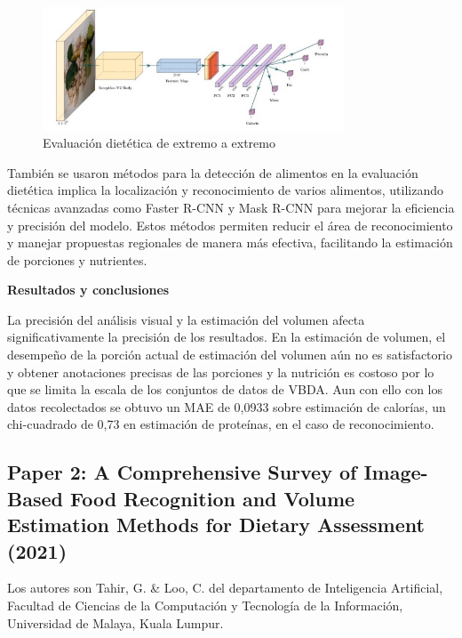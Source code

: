 \begin{figure}[h]
		\begin{center}
			\includegraphics[width=0.8\textwidth]{2/imagen2/7FIGURA7PAPER2.JPG}
			\caption{Evaluación dietética de extremo a extremo}
			\label{fig3}
		\end{center}
		
	\end{figure}

\thinspace
También se usaron métodos para la detección de alimentos en la evaluación dietética implica la localización y reconocimiento de varios alimentos, utilizando técnicas avanzadas como Faster R-CNN y Mask R-CNN para mejorar la eficiencia y precisión del modelo. Estos métodos permiten reducir el área de reconocimiento y manejar propuestas regionales de manera más efectiva, facilitando la estimación de porciones y nutrientes. 

\thinspace

\textbf{Resultados y conclusiones}

\thinspace
La precisión del análisis visual y la estimación del volumen afecta significativamente la precisión de los resultados. En la estimación de volumen, el desempeño de la porción actual de estimación del volumen aún no es satisfactorio y obtener anotaciones precisas de las porciones y la nutrición es costoso por lo que se limita la escala de los conjuntos de datos de VBDA. Aun con ello con los datos recolectados se obtuvo un MAE de 0,0933 sobre estimación de calorías, un chi-cuadrado de 0,73 en estimación de proteínas, en el caso de reconocimiento. 

\subsection{Paper 2: A Comprehensive Survey of Image-Based Food Recognition and Volume Estimation Methods for Dietary Assessment (2021)}

Los autores son Tahir, G. \& Loo, C. del departamento de Inteligencia Artificial, Facultad de Ciencias de la Computación y Tecnología de la Información, Universidad de Malaya, Kuala Lumpur. \parencite{tahir2021comprehensive}

